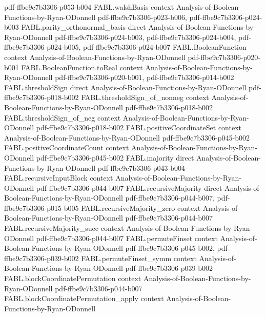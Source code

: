 \begin{theorem}
{    pdf-ffbe9c7b3306-p053-b004}
\proofstep
  {FABL.walshBasis}
  {context}
  {Analysis-of-Boolean-Functions-by-Ryan-ODonnell}
  {pdf-ffbe9c7b3306-p023-b006,
    pdf-ffbe9c7b3306-p024-b003}
\proofstep
  {FABL.parity_orthonormal_basis}
  {direct}
  {Analysis-of-Boolean-Functions-by-Ryan-ODonnell}
  {pdf-ffbe9c7b3306-p024-b003,
    pdf-ffbe9c7b3306-p024-b004,
    pdf-ffbe9c7b3306-p024-b005,
    pdf-ffbe9c7b3306-p024-b007}
\proofstep
  {FABL.BooleanFunction}
  {context}
  {Analysis-of-Boolean-Functions-by-Ryan-ODonnell}
  {pdf-ffbe9c7b3306-p020-b001}
\proofstep
  {FABL.BooleanFunction.toReal}
  {context}
  {Analysis-of-Boolean-Functions-by-Ryan-ODonnell}
  {pdf-ffbe9c7b3306-p020-b001,
    pdf-ffbe9c7b3306-p014-b002}
\proofstep
  {FABL.thresholdSign}
  {direct}
  {Analysis-of-Boolean-Functions-by-Ryan-ODonnell}
  {pdf-ffbe9c7b3306-p018-b002}
\proofstep
  {FABL.thresholdSign_of_nonneg}
  {context}
  {Analysis-of-Boolean-Functions-by-Ryan-ODonnell}
  {pdf-ffbe9c7b3306-p018-b002}
\proofstep
  {FABL.thresholdSign_of_neg}
  {context}
  {Analysis-of-Boolean-Functions-by-Ryan-ODonnell}
  {pdf-ffbe9c7b3306-p018-b002}
\proofstep
  {FABL.positiveCoordinateSet}
  {context}
  {Analysis-of-Boolean-Functions-by-Ryan-ODonnell}
  {pdf-ffbe9c7b3306-p045-b002}
\proofstep
  {FABL.positiveCoordinateCount}
  {context}
  {Analysis-of-Boolean-Functions-by-Ryan-ODonnell}
  {pdf-ffbe9c7b3306-p045-b002}
\proofstep
  {FABL.majority}
  {direct}
  {Analysis-of-Boolean-Functions-by-Ryan-ODonnell}
  {pdf-ffbe9c7b3306-p043-b004}
\proofstep
  {FABL.recursiveInputBlock}
  {context}
  {Analysis-of-Boolean-Functions-by-Ryan-ODonnell}
  {pdf-ffbe9c7b3306-p044-b007}
\proofstep
  {FABL.recursiveMajority}
  {direct}
  {Analysis-of-Boolean-Functions-by-Ryan-ODonnell}
  {pdf-ffbe9c7b3306-p044-b007,
    pdf-ffbe9c7b3306-p015-b005}
\proofstep
  {FABL.recursiveMajority_zero}
  {context}
  {Analysis-of-Boolean-Functions-by-Ryan-ODonnell}
  {pdf-ffbe9c7b3306-p044-b007}
\proofstep
  {FABL.recursiveMajority_succ}
  {context}
  {Analysis-of-Boolean-Functions-by-Ryan-ODonnell}
  {pdf-ffbe9c7b3306-p044-b007}
\proofstep
  {FABL.permuteFinset}
  {context}
  {Analysis-of-Boolean-Functions-by-Ryan-ODonnell}
  {pdf-ffbe9c7b3306-p045-b002,
    pdf-ffbe9c7b3306-p039-b002}
\proofstep
  {FABL.permuteFinset_symm}
  {context}
  {Analysis-of-Boolean-Functions-by-Ryan-ODonnell}
  {pdf-ffbe9c7b3306-p039-b002}
\proofstep
  {FABL.blockCoordinatePermutation}
  {context}
  {Analysis-of-Boolean-Functions-by-Ryan-ODonnell}
  {pdf-ffbe9c7b3306-p044-b007}
\proofstep
  {FABL.blockCoordinatePermutation_apply}
  {context}
  {Analysis-of-Boolean-Functions-by-Ryan-ODonnell}

\end{theorem}
